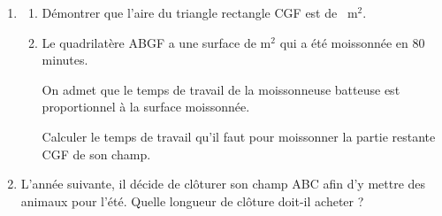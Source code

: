 \documentclass[exercice,a4]{thedocument}%
\begin{document}
\begin{enumerate}[start=3]
\item
	\begin{enumerate}
		\item Démontrer que l'aire du triangle rectangle CGF est de ~m$^2$.
		\item Le quadrilatère ABGF a une surface de  m$^2$ qui a été moissonnée en 80 minutes.
		
On admet que le temps de travail de la moissonneuse batteuse est proportionnel à la surface moissonnée.

Calculer le temps de travail qu'il faut pour moissonner la partie restante CGF de son champ.
	\end{enumerate}
\item L'année suivante, il décide de clôturer son champ ABC afin d'y mettre des animaux pour l'été. Quelle longueur de clôture doit-il acheter ?
\end{enumerate}

\bigskip
\showthesource
\end{document}
